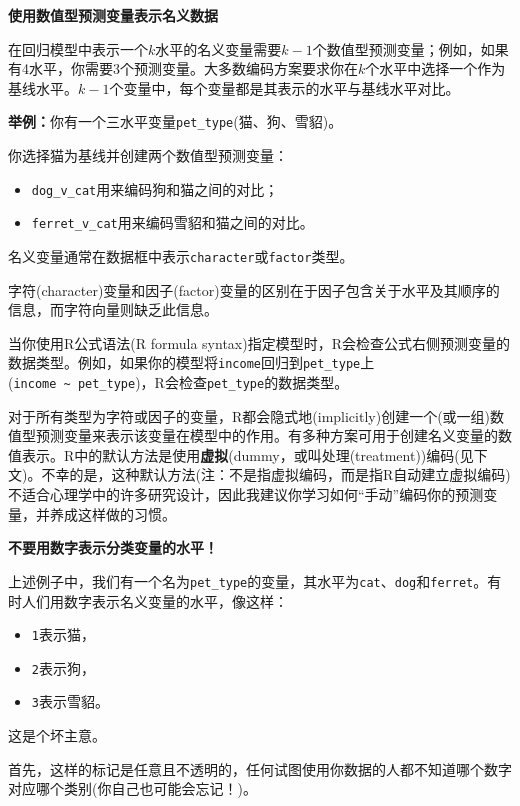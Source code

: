 \documentclass[
]{book}
\providecommand{\tightlist}{%
  \setlength{\itemsep}{0pt}\setlength{\parskip}{0pt}}
\begin{document}
\textbf{使用数值型预测变量表示名义数据}

在回归模型中表示一个\(k\)水平的名义变量需要\(k-1\)个数值型预测变量；例如，如果有4水平，你需要3个预测变量。大多数编码方案要求你在\(k\)个水平中选择一个作为基线水平。\(k-1\)个变量中，每个变量都是其表示的水平与基线水平对比。

\textbf{举例：}你有一个三水平变量\texttt{pet\_type}(猫、狗、雪貂)。

你选择猫为基线并创建两个数值型预测变量：

\begin{itemize}
\tightlist
\item
  \texttt{dog\_v\_cat}用来编码狗和猫之间的对比；
\item
  \texttt{ferret\_v\_cat}用来编码雪貂和猫之间的对比。
\end{itemize}

名义变量通常在数据框中表示\texttt{character}或\texttt{factor}类型。

字符(character)变量和因子(factor)变量的区别在于因子包含关于水平及其顺序的信息，而字符向量则缺乏此信息。

当你使用R公式语法(R formula syntax)指定模型时，R会检查公式右侧预测变量的数据类型。例如，如果你的模型将\texttt{income}回归到\texttt{pet\_type}上(\texttt{income\ \textasciitilde{}\ pet\_type})，R会检查\texttt{pet\_type}的数据类型。

对于所有类型为字符或因子的变量，R都会隐式地(implicitly)创建一个(或一组)数值型预测变量来表示该变量在模型中的作用。有多种方案可用于创建名义变量的数值表示。R中的默认方法是使用\textbf{虚拟}(dummy，或叫处理(treatment))编码(见下文)。不幸的是，这种默认方法(注：不是指虚拟编码，而是指R自动建立虚拟编码)不适合心理学中的许多研究设计，因此我建议你学习如何``手动''编码你的预测变量，并养成这样做的习惯。

\textbf{不要用数字表示分类变量的水平！}

上述例子中，我们有一个名为\texttt{pet\_type}的变量，其水平为\texttt{cat}、\texttt{dog}和\texttt{ferret}。有时人们用数字表示名义变量的水平，像这样：

\begin{itemize}
\tightlist
\item
  \texttt{1}表示猫，
\item
  \texttt{2}表示狗，
\item
  \texttt{3}表示雪貂。
\end{itemize}

这是个坏主意。

首先，这样的标记是任意且不透明的，任何试图使用你数据的人都不知道哪个数字对应哪个类别(你自己也可能会忘记！)。
\end{document}
